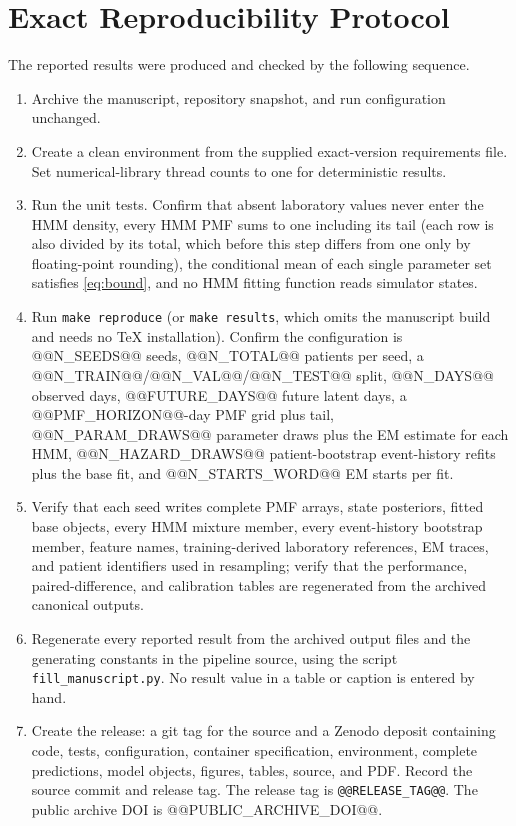 \documentclass{ieeeaccess}
\begin{document}
\section{\texorpdfstring{\break}{}Exact Reproducibility Protocol}\label{app:protocol}
The reported results were produced and checked by the following sequence.
\begin{enumerate}
\item Archive the manuscript, repository snapshot, and run configuration unchanged.
\item Create a clean environment from the supplied exact-version requirements file. Set numerical-library thread counts to one for deterministic results.
\item Run the unit tests. Confirm that absent laboratory values never enter the HMM density, every HMM PMF sums to one including its tail (each row is also divided by its total, which before this step differs from one only by floating-point rounding), the conditional mean of each single parameter set satisfies \eqref{eq:bound}, and no HMM fitting function reads simulator states.
\item Run \texttt{make reproduce} (or \texttt{make results}, which omits the manuscript build and needs no \TeX{} installation). Confirm the configuration is @@N_SEEDS@@ seeds, @@N_TOTAL@@ patients per seed, a @@N_TRAIN@@/@@N_VAL@@/@@N_TEST@@ split, @@N_DAYS@@ observed days, @@FUTURE_DAYS@@ future latent days, a @@PMF_HORIZON@@-day PMF grid plus tail, @@N_PARAM_DRAWS@@ parameter draws plus the EM estimate for each HMM, @@N_HAZARD_DRAWS@@ patient-bootstrap event-history refits plus the base fit, and @@N_STARTS_WORD@@ EM starts per fit.
\item Verify that each seed writes complete PMF arrays, state posteriors, fitted base objects, every HMM mixture member, every event-history bootstrap member, feature names, training-derived laboratory references, EM traces, and patient identifiers used in resampling; verify that the performance, paired-difference, and calibration tables are regenerated from the archived canonical outputs.
\item Regenerate every reported result from the archived output files and the generating constants in the pipeline source, using the script \texttt{fill\_\allowbreak manuscript.py}. No result value in a table or caption is entered by hand.
\item Create the release: a git tag for the source and a Zenodo deposit containing code, tests, configuration, container specification, environment, complete predictions, model objects, figures, tables, source, and PDF. Record the source commit and release tag. The release tag is \texttt{@@RELEASE_TAG@@}. The public archive DOI is @@PUBLIC_ARCHIVE_DOI@@.
\end{enumerate}
\end{document}
